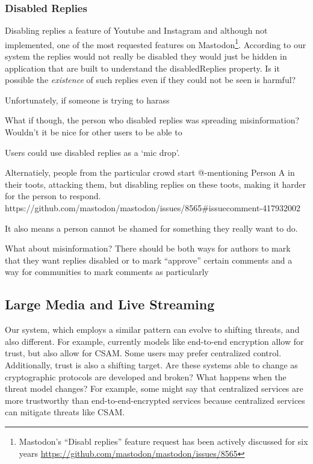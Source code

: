 \subsubsection{Disabled Replies}

Disabling replies a feature of Youtube and Instagram and although not
implemented, one of the most requested features on Mastodon\footnote{
    Mastodon's ``Disabl replies'' feature request has been actively discussed
    for six years
    \url{https://github.com/mastodon/mastodon/issues/8565}
}.
According to our system the replies would not really be disabled
they would just be hidden in application that are built to understand
the disabledReplies property.
Is it possible the \emph{existence} of such replies even if they could
not be seen is harmful?

Unfortunately, if someone is trying to harass

What if though, the person who disabled replies was spreading misinformation?
Wouldn't it be nice for other users to be able to

Users could use disabled replies as a `mic drop'.

Alternatiely,
people from the particular crowd start
@-mentioning Person A in their toots, attacking them,
but disabling replies on these toots, making it harder
for the person to respond.
https://github.com/mastodon/mastodon/issues/8565#issuecomment-417932002

It also means a person cannot be shamed for something they really
want to do.

What about misinformation? There should be both ways for authors to
mark that they want replies disabled or to mark ``approve'' certain comments
and a way for communities to
mark comments as particularly

\subsection{Large Media and Live Streaming}


Our system, which employs a similar pattern can evolve to shifting threats,
and also different. For example, currently models like end-to-end encryption
allow for trust, but also allow for CSAM. Some users may prefer centralized control.
Additionally, trust is also a shifting target.
Are these systems able to change as cryptographic protocols
are developed and broken?
What happens when the threat model changes? For example,
some might say that centralized services are more trustworthy
than end-to-end-encrypted services because centralized services can
mitigate threats like CSAM.


